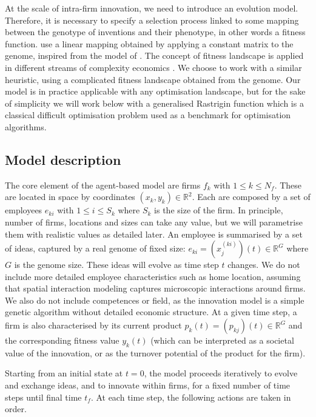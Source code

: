 \documentclass[letterpaper]{article}
\begin{document}
At the scale of intra-firm innovation, we need to introduce an evolution model. Therefore, it is necessary to specify a selection process linked to some mapping between the genotype of inventions and their phenotype, in other words a fitness function. \cite{ma2005agent} use a linear mapping obtained by applying a constant matrix to the genome, inspired from the model of \cite{kauffman1995technological}. The concept of fitness landscape is applied in different streams of complexity economics \citep{khraisha2020complex}. We choose to work with a similar heuristic, using a complicated fitness landscape obtained from the genome. Our model is in practice applicable with any optimisation landscape, but for the sake of simplicity we will work below with a generalised Rastrigin function which is a classical difficult optimisation problem used as a benchmark for optimisation algorithms.


\subsection{Model description}

The core element of the agent-based model are firms $f_k$ with $1 \leq k \leq N_f$. These are located in space by coordinates $(x_k,y_k) \in \mathbb{R}^2$. Each are composed by a set of employees $e_{ki}$ with $1 \leq i \leq S_k$ where $S_k$ is the size of the firm. In principle, number of firms, locations and sizes can take any value, but we will parametrise them with realistic values as detailed later. An employee is summarised by a set of ideas, captured by a real genome of fixed size: $e_{ki} = (x^{(ki)}_j) (t) \in \mathbb{R}^G$ where $G$ is the genome size. These ideas will evolve as time step $t$ changes. We do not include more detailed employee characteristics such as home location, assuming that spatial interaction modeling captures microscopic interactions around firms. We also do not include competences or field, as the innovation model is a simple genetic algorithm without detailed economic structure. At a given time step, a firm is also characterised by its current product $p_k (t) = (p_{kj})(t)\in \mathbb{R}^G$ and the corresponding fitness value $y_k (t)$ (which can be interpreted as a societal value of the innovation, or as the turnover potential of the product for the firm).

Starting from an initial state at $t = 0$, the model proceeds iteratively to evolve and exchange ideas, and to innovate within firms, for a fixed number of time steps until final time $t_f$. At each time step, the following actions are taken in order.
\end{document}
